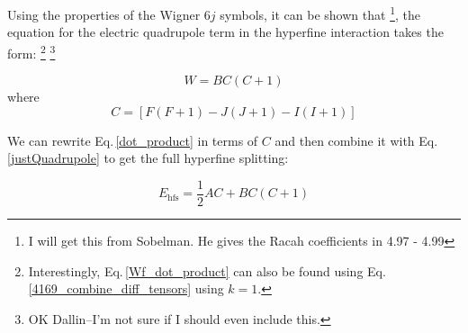 Using the properties of the Wigner $6j$ symbols, it can be shown that \footnote{I will get this from Sobelman. He gives the Racah coefficients in 4.97 - 4.99}, the equation for the electric quadrupole term in the hyperfine interaction takes the form:
\footnote{Interestingly, Eq.\,\ref{Wf_dot_product} can also be found using Eq.\,\ref{4169_combine_diff_tensors} using $k=1$.}
\footnote{OK Dallin--I'm not sure if I should even include this.} 

\begin{equation}\label{justQuadrupole}
W=BC(C+1)
\end{equation}
where 
\begin{equation}
C=[F(F+1)-J(J+1)-I(I+1)]
\end{equation}

We can rewrite Eq.\,\ref{dot_product} in terms of $C$ and then combine it with Eq.\,\ref{justQuadrupole} to get the full hyperfine splitting: 

\begin{equation}\label{Standard_hyperfine_AB}
E_{\mathrm{hfs}}=\frac{1}{2}AC+BC(C+1)
\end{equation}

\cite{cuaMITnotes}


